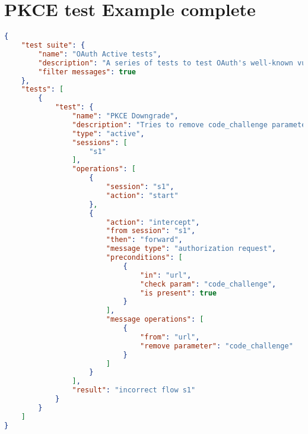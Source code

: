 \chapter{PKCE test Example complete}
\label{chap:PKCE_complete}
\begin{lstlisting}[language=json]
{
    "test suite": {
        "name": "OAuth Active tests",
        "description": "A series of tests to test OAuth's well-known vulnerabilities",
        "filter messages": true
    },
    "tests": [     
        {
            "test": {
                "name": "PKCE Downgrade",
                "description": "Tries to remove code_challenge parameter",
                "type": "active",
                "sessions": [
                    "s1"
                ],
                "operations": [
                    {
                        "session": "s1",
                        "action": "start"
                    },
                    {
                        "action": "intercept",
                        "from session": "s1",
                        "then": "forward",
                        "message type": "authorization request",
                        "preconditions": [
                            {
                                "in": "url",
                                "check param": "code_challenge",
                                "is present": true
                            }
                        ],
                        "message operations": [
                            {
                                "from": "url",
                                "remove parameter": "code_challenge"
                            }
                        ]
                    }
                ],
                "result": "incorrect flow s1"
            }
        }
    ]
}
\end{lstlisting}

